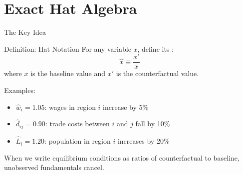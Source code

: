 \documentclass{beamer}
\begin{document}

\section{Exact Hat Algebra}

\begin{frame}{The Key Idea}

    \begin{exampleblock}{Definition: Hat Notation}
        For any variable $x$, define its :
        \[ \hat{x} \equiv \frac{x'}{x} \]
        where $x$ is the baseline value and $x'$ is the counterfactual value.
    \end{exampleblock}

    \vspace{0.5em}
    Examples:
    \begin{itemize}
        \item $\hat{w}_i = 1.05$: wages in region $i$ increase by 5\%
        \item $\hat{d}_{ij} = 0.90$: trade costs between $i$ and $j$ fall by 10\%
        \item $\hat{L}_i = 1.20$: population in region $i$ increases by 20\%
    \end{itemize}

    \vspace{0.5em}
     When we write equilibrium conditions as ratios of counterfactual to baseline, unobserved fundamentals cancel.

\end{frame}
\end{document}
